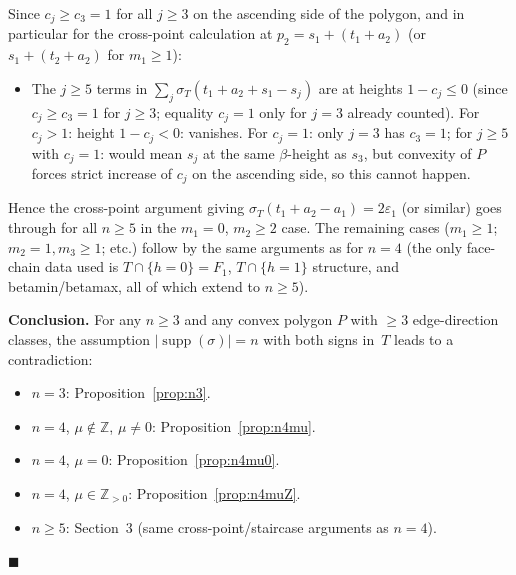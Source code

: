 \documentclass{article}
\begin{document}
Since $c_j\ge c_3=1$ for all $j\ge 3$ on the ascending side of the polygon, and in particular
for the cross-point calculation at $p_2=s_1+(t_1+a_2)$ (or $s_1+(t_2+a_2)$ for $m_1\ge 1$):
\begin{itemize}
\item The $j\ge 5$ terms in $\sum_j\sigma_T(t_1+a_2+s_1-s_j)$ are at heights $1-c_j\le 0$
  (since $c_j\ge c_3=1$ for $j\ge 3$; equality $c_j=1$ only for $j=3$ already counted).
  For $c_j>1$: height $1-c_j<0$: vanishes.  For $c_j=1$: only $j=3$ has $c_3=1$;
  for $j\ge 5$ with $c_j=1$: would mean $s_j$ at the same $\beta$-height as $s_3$,
  but convexity of $P$ forces strict increase of $c_j$ on the ascending side, so this cannot happen.
\end{itemize}
Hence the cross-point argument giving $\sigma_T(t_1+a_2-a_1)=2\varepsilon_1$ (or similar)
goes through for all $n\ge 5$ in the $m_1=0$, $m_2\ge 2$ case.  The remaining cases
($m_1\ge 1$; $m_2=1,m_3\ge 1$; etc.) follow by the same arguments as for $n=4$
(the only face-chain data used is $T\cap\{h=0\}=F_1$, $T\cap\{h=1\}$ structure, and betamin/betamax,
all of which extend to $n\ge 5$).

\bigskip
\noindent\textbf{Conclusion.}
For any $n\ge 3$ and any convex polygon $P$ with $\ge 3$ edge-direction classes,
the assumption $|\operatorname{supp}(\sigma)|=n$ with both signs in~$T$ leads to a contradiction:
\begin{itemize}
  \item $n=3$: Proposition~\ref{prop:n3}.
  \item $n=4$, $\mu\notin\mathbb{Z}$, $\mu\ne 0$: Proposition~\ref{prop:n4mu}.
  \item $n=4$, $\mu=0$: Proposition~\ref{prop:n4mu0}.
  \item $n=4$, $\mu\in\mathbb{Z}_{>0}$: Proposition~\ref{prop:n4muZ}.
  \item $n\ge 5$: Section~3 (same cross-point/staircase arguments as $n=4$).
\end{itemize}
$\blacksquare$
\end{document}
